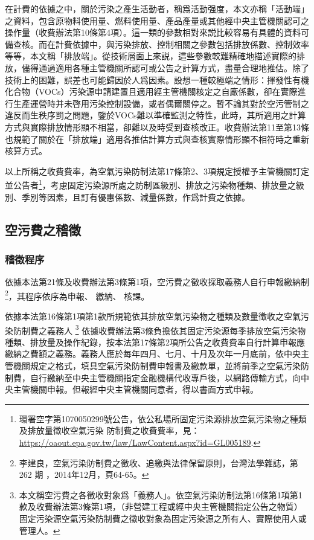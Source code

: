 在計費的依據之中，關於污染之產生活動者，稱爲活動强度，本文亦稱「活動端」之資料，包含原物料使用量、燃料使用量、產品產量或其他經中央主管機關認可之操作量（收費辦法第10條第4項）。這一類的參數相對來説比較容易有具體的資料可備查核。而在計費依據中，與污染排放、控制相關之參數包括排放係數、控制效率等等，本文稱「排放端」。從技術層面上來説，這些參數較難精確地描述實際的排放，儘得通過適用各種主管機關所認可或公告之計算方式，盡量合理地推估。除了技術上的困難，誤差也可能歸因於人爲因素。設想一種較極端之情形：揮發性有機化合物（VOCs）污染源申請建置且適用經主管機關核定之自廠係數，卻在實際進行生產運營時并未啓用污染控制設備，或者偶爾關停之。暫不論其對於空污管制之違反而生秩序罰之問題，鑒於VOCs難以準確監測之特性，此時，其所適用之計算方式與實際排放情形顯不相當，卻難以及時受到查核改正。收費辦法第11至第13條也規範了關於在「排放端」適用各推估計算方式與查核實際情形顯不相符時之重新核算方式。


以上所稱之收費費率，為空氣污染防制法第17條第2、3項規定授權予主管機關訂定並公告者\footnote{環署空字第1070050299號公告，依公私場所固定污染源排放空氣污染物之種類及排放量徵收空氣污染
防制費之收費費率，見：\url{https://oaout.epa.gov.tw/law/LawContent.aspx?id=GL005189}.}，考慮固定污染源所處之防制區級別、排放之污染物種類、排放量之級別、季別等因素，且訂有優惠係數、減量係數，作爲計費之依據。







\subsection{空污費之稽徵}

\subsubsection{稽徵程序}

依據本法第21條及收費辦法第3條第1項，空污費之徵收採取義務人自行申報繳納制\footnote{李建良，空氣污染防制費之徵收、追繳與法律保留原則，台灣法學雜誌，第 262 期 ，2014年12月，頁64-65。}，其程序依序為申報、 繳納、 核課。

依據本法第16條第1項第1款所規範依其排放空氣污染物之種類及數量徵收之空氣污染防制費之義務人
\footnote{本文稱空污費之各徵收對象爲「義務人」。依空氣污染防制法第16條第1項第1款及收費辦法第3條第1項，（非營建工程或經中央主管機關指定公告之物質）固定污染源空氣污染防制費之徵收對象為固定污染源之所有人、實際使用人或管理人。}
依據收費辦法第3條負擔依其固定污染源每季排放空氣污染物種類、排放量及操作紀錄，按本法第17條第2項所公告之收費費率自行計算申報應繳納之費額之義務。義務人應於每年四月、七月、十月及次年一月底前，依中央主管機關規定之格式，填具空氣污染防制費申報書及繳款單，並將前季之空氣污染防制費，自行繳納至中央主管機關指定金融機構代收專戶後，以網路傳輸方式，向中央主管機關申報。但報經中央主管機關同意者，得以書面方式申報。

